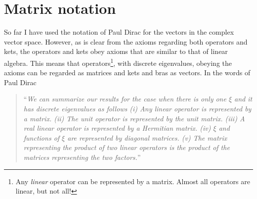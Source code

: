 \section{Matrix notation}
So far I have used the notation of Paul Dirac for the vectors in the complex vector space. However, as is clear from the axioms regarding both operators and kets, the operators and kets obey axioms that are similar to that of linear algebra. This means that operators\footnote{Any \emph{linear} operator can be represented by a matrix. Almost all operators are linear, but not all!}, with discrete eigenvalues, obeying the axioms can be regarded as matrices and kets and bras as vectors. In the words of Paul Dirac~\citep[p.69]{dirac}
\begin{quote}
	“\textit{We can summarize our results for the case when there is only one $\xi$ and it has discrete eigenvalues as follows \newline
		(i) Any linear operator is represented by a matrix. \newline
		(ii) The unit operator is represented by the unit matrix. \newline
		(iii) A real linear operator is represented by a Hermitian matrix.\newline
		(iv) $\xi$ and functions of $\xi$ are represented by diagonal matrices.\newline
		(v) The matrix representing the product of two linear operators is the product of the matrices representing the two factors.}”
\end{quote}

